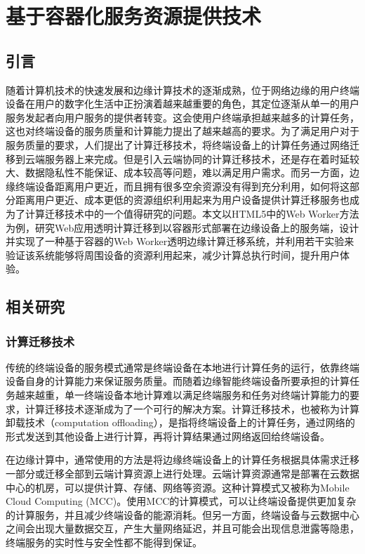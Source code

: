 
\chapter{基于容器化服务资源提供技术}\label{chap:computation_offloading}

\section{引言}

随着计算机技术的快速发展和边缘计算技术的逐渐成熟，位于网络边缘的用户终端设备在用户的数字化生活中正扮演着越来越重要的角色，其定位逐渐从单一的用户服务发起者向用户服务的提供者转变。这会使用户终端承担越来越多的计算任务，这也对终端设备的服务质量和计算能力提出了越来越高的要求。为了满足用户对于服务质量的要求，人们提出了计算迁移技术，将终端设备上的计算任务通过网络迁移到云端服务器上来完成。但是引入云端协同的计算迁移技术，还是存在着时延较大、数据隐私性不能保证、成本较高等问题，难以满足用户需求。而另一方面，边缘终端设备距离用户更近，而且拥有很多空余资源没有得到充分利用，如何将这部分距离用户更近、成本更低的资源组织利用起来为用户设备提供计算迁移服务也成为了计算迁移技术中的一个值得研究的问题。本文以HTML5中的Web Worker方法为例，研究Web应用透明计算迁移到以容器形式部署在边缘设备上的服务端，设计并实现了一种基于容器的Web Worker透明边缘计算迁移系统，并利用若干实验来验证该系统能够将周围设备的资源利用起来，减少计算总执行时间，提升用户体验。

\section{相关研究} 

\subsection{计算迁移技术}

传统的终端设备的服务模式通常是终端设备在本地进行计算任务的运行，依靠终端设备自身的计算能力来保证服务质量。而随着边缘智能终端设备所要承担的计算任务越来越重，单一终端设备本地计算难以满足终端服务和任务对终端计算能力的要求，计算迁移技术逐渐成为了一个可行的解决方案。计算迁移技术，也被称为计算卸载技术（computation offloading），是指将终端设备上的计算任务，通过网络的形式发送到其他设备上进行计算，再将计算结果通过网络返回给终端设备。

在边缘计算中，通常使用的方法是将边缘终端设备上的计算任务根据具体需求迁移一部分或迁移全部到云端计算资源上进行处理。云端计算资源通常是部署在云数据中心的机房，可以提供计算、存储、网络等资源。这种计算模式又被称为Mobile Cloud Computing (MCC)。使用MCC的计算模式，可以让终端设备提供更加复杂的计算服务，并且减少终端设备的能源消耗。但另一方面，终端设备与云数据中心之间会出现大量数据交互，产生大量网络延迟，并且可能会出现信息泄露等隐患，终端服务的实时性与安全性都不能得到保证。

